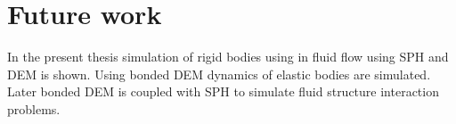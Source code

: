 \chapter{Future work}
\label{cha:future-work}


In the present thesis simulation of rigid bodies using in fluid flow using SPH
and DEM is shown. Using bonded DEM dynamics of elastic bodies are simulated.
Later bonded DEM is coupled with SPH to simulate fluid structure interaction
problems.

